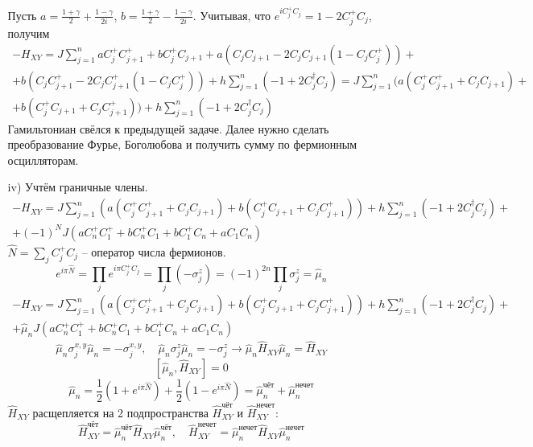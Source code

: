 \documentclass[12pt]{article}
\theoremstyle{definition}
\begin{document}
\begin{enumerate}
\begin{itemize}
\begin{multline}
        \end{multline}
        Пусть $a=\frac{1+\gamma}{2}+\frac{1-\gamma}{2i}$, $b=\frac{1+\gamma}{2}-\frac{1-\gamma}{2i}$. Учитывая, что $e^{iC^+_jC_j}=1-2C^+_jC_j$, получим
        \begin{multline}
            -H_{XY}=J\sum\limits_{j=1}^naC^+_jC^+_{j+1}+bC^+_jC_{j+1}+a(C_jC_{j+1}-2C_jC_{j+1}(1-C_jC^+_j))+\\+b(C_jC^+_{j+1}-2C_jC^+_{j+1}(1-C_jC^+_j))+h\sum\limits_{j=1}^n(-1+2C^\dagger_jC_j)=J\sum\limits_{j=1}^n(a(C^+_jC^+_{j+1}+C_jC_{j+1})+\\+b(C^+_jC_{j+1}+C_jC^+_{j+1}))+h\sum\limits_{j=1}^n(-1+2C^\dagger_jC_j)
        \end{multline}
        Гамильтониан свёлся к предыдущей задаче. Далее нужно сделать преобразование Фурье, Боголюбова и получить сумму по фермионным осцилляторам.
        \item[iv)] Учтём граничные члены.
        \begin{multline}
            -H_{XY}=J\sum\limits_{j=1}^n(a(C^+_jC^+_{j+1}+C_jC_{j+1})+b(C^+_jC_{j+1}+C_jC^+_{j+1}))+h\sum\limits_{j=1}^n(-1+2C^\dagger_jC_j)+\\+(-1)^NJ(aC_n^+C_1^++bC_n^+C_1+bC_1^+C_n+aC_1C_n)
        \end{multline}
        $\hat{N}=\sum\limits_jC_j^+C_j$ -- оператор числа фермионов.
        \begin{equation}
            e^{i\pi\hat{N}}=\prod\limits_je^{i\pi C^+_jC_j}=\prod\limits_j(-\sigma_j^z)=(-1)^{2n}\prod\limits_j\sigma_j^z=\hat{\mu}_n
        \end{equation}
        \begin{multline}
            -H_{XY}=J\sum\limits_{j=1}^n(a(C^+_jC^+_{j+1}+C_jC_{j+1})+b(C^+_jC_{j+1}+C_jC^+_{j+1}))+h\sum\limits_{j=1}^n(-1+2C^\dagger_jC_j)+\\+\hat{\mu}_nJ(aC_n^+C_1^++bC_n^+C_1+bC_1^+C_n+aC_1C_n)
        \end{multline}
        \begin{equation}
            \hat{\mu}_n\sigma_j^{x,y}\hat{\mu}_n=-\sigma_j^{x,y},\quad\hat{\mu}_n\sigma_j^z\hat{\mu}_n=-\sigma_j^z\rightarrow\hat{\mu}_n\hat{H}_{XY}\hat{\mu}_n=\hat{H}_{XY}
        \end{equation}
        \begin{equation}
            \boxed{[\hat{\mu}_n,\hat{H}_{XY}]=0}
        \end{equation}
        \begin{equation}
            \hat{\mu}_n=\frac{1}{2}(1+e^{i\pi\hat{N}})+\frac{1}{2}(1-e^{i\pi\hat{N}})=\hat{\mu}_n^\text{чёт}+\hat{\mu}_n^\text{нечет}
        \end{equation}
        $\hat{H}_{XY}$ расщепляется на 2 подпространства $\hat{H}^\text{чёт}_{XY}$ и $\hat{H}^\text{нечет}_{XY}$:
        \begin{equation}
            \hat{H}^\text{чёт}_{XY}=\hat{\mu}_n^\text{чёт}\hat{H}_{XY}\hat{\mu}_n^\text{чёт},\quad\hat{H}^\text{нечет}_{XY}=\hat{\mu}_n^\text{нечет}\hat{H}_{XY}\hat{\mu}_n^\text{нечет}
        \end{equation}
    \end{itemize}
\end{enumerate}
\end{document}
